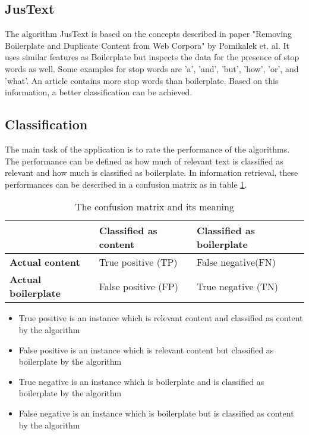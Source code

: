  \subsection{JusText}

The algorithm JusText \cite{algo:justext} is based on the concepts described in paper "Removing Boilerplate and Duplicate Content from Web Corpora" \cite{paper:justext} by Pomikalek et. al. It uses similar features as Boilerplate but inspects the data for the presence of stop words as well. Some examples for stop words are 'a', 'and', 'but', 'how', 'or', and 'what'. An article contains more stop words than boilerplate. Based on this information, a better classification can be achieved.

\subsection{Classification}

The main task of the application is to rate the performance of the algorithms. The performance can be defined as how much of relevant text is classified as relevant and how much is classified as boilerplate. In information retrieval, these performances can be described in a confusion matrix as in table \ref{confusionMatrix}. 

\begin{table}[!ht]
\begin{tabular}{|p{4cm} |p{5.5cm} |p{5.5cm} |}\hline
          								& \textbf{Classified as content} 	& \textbf{Classified as boilerplate} 	\\ \hline
\textbf{Actual content} 				& True positive (TP)				& False negative(FN)					\\ \hline
\textbf{Actual boilerplate} 			& False positive (FP)       		& True negative (TN)				 	\\ \hline
\end{tabular}
\caption{The confusion matrix and its meaning}
\label{confusionMatrix}
\end{table}

\begin{itemize}
\item True positive is an instance which is relevant content and classified as content by the algorithm
\item False positive is an instance which is relevant content but classified as boilerplate by the algorithm 
\item True negative is an instance which is boilerplate and is classified as boilerplate by the algorithm
\item False negative is an instance which is boilerplate but is classified as content by the algorithm
\end{itemize}

